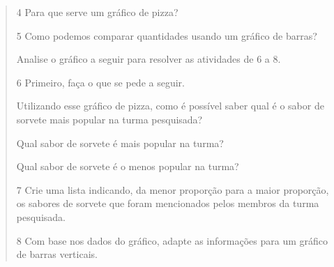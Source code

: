 \begin{quote}
\num{4} Para que serve um gráfico de pizza?



\num{5} Como podemos comparar quantidades usando um gráfico de barras?



Analise o gráfico a seguir para resolver as atividades de 6 a 8.

\begin{figure}[htpb!]
\end{figure}

\num{6} Primeiro, faça o que se pede a seguir.

\begin{escolha}
\item Utilizando esse gráfico de pizza, como é possível saber qual é o sabor de sorvete mais popular na turma pesquisada?



\item Qual sabor de sorvete é mais popular na turma?



\item Qual sabor de sorvete é o menos popular na turma?

\end{escolha}

\num{7} Crie uma lista indicando, da menor proporção para a maior proporção, os sabores de sorvete que foram mencionados pelos membros da turma pesquisada.



\num{8} Com base nos dados do gráfico, adapte as informações para um gráfico de barras verticais.




\end{quote}
